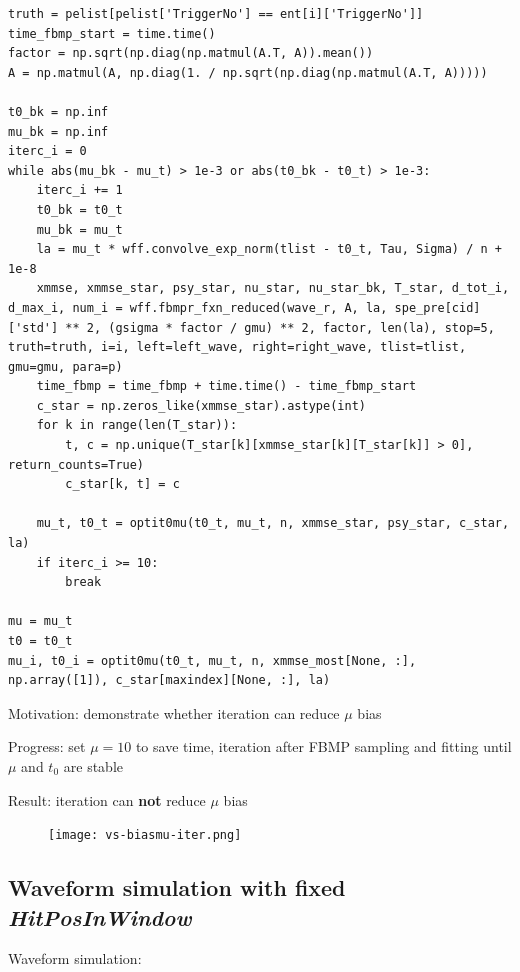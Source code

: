 \documentclass[notitlepage]{article}
\begin{document}
\begin{lstlisting}
truth = pelist[pelist['TriggerNo'] == ent[i]['TriggerNo']]
time_fbmp_start = time.time()
factor = np.sqrt(np.diag(np.matmul(A.T, A)).mean())
A = np.matmul(A, np.diag(1. / np.sqrt(np.diag(np.matmul(A.T, A)))))

t0_bk = np.inf
mu_bk = np.inf
iterc_i = 0
while abs(mu_bk - mu_t) > 1e-3 or abs(t0_bk - t0_t) > 1e-3:
    iterc_i += 1
    t0_bk = t0_t
    mu_bk = mu_t
    la = mu_t * wff.convolve_exp_norm(tlist - t0_t, Tau, Sigma) / n + 1e-8
    xmmse, xmmse_star, psy_star, nu_star, nu_star_bk, T_star, d_tot_i, d_max_i, num_i = wff.fbmpr_fxn_reduced(wave_r, A, la, spe_pre[cid]['std'] ** 2, (gsigma * factor / gmu) ** 2, factor, len(la), stop=5, truth=truth, i=i, left=left_wave, right=right_wave, tlist=tlist, gmu=gmu, para=p)
    time_fbmp = time_fbmp + time.time() - time_fbmp_start
    c_star = np.zeros_like(xmmse_star).astype(int)
    for k in range(len(T_star)):
        t, c = np.unique(T_star[k][xmmse_star[k][T_star[k]] > 0], return_counts=True)
        c_star[k, t] = c

    mu_t, t0_t = optit0mu(t0_t, mu_t, n, xmmse_star, psy_star, c_star, la)
    if iterc_i >= 10:
        break

mu = mu_t
t0 = t0_t
mu_i, t0_i = optit0mu(t0_t, mu_t, n, xmmse_most[None, :], np.array([1]), c_star[maxindex][None, :], la)
\end{lstlisting}

Motivation: demonstrate whether iteration can reduce $\mu$ bias

Progress: set $\mu=10$ to save time, iteration after FBMP sampling and fitting until $\mu$ and $t_0$ are stable

Result: iteration can \textbf{not} reduce $\mu$ bias

\begin{figure}[H]
    \centering
    \texttt{[image: vs-biasmu-iter.png]}
\end{figure}

\subsection{Waveform simulation with fixed \textit{HitPosInWindow}}

Waveform simulation:
\end{document}
